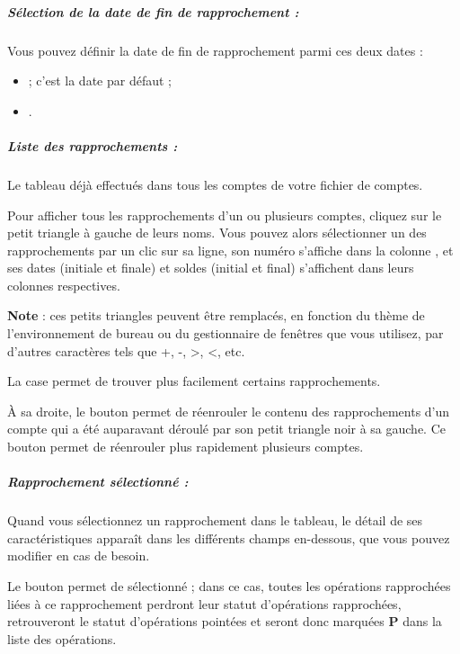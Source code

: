 \subparagraph{Sélection de la date de fin de rapprochement :\label{setup-operations-reconciliation-date}}

Vous pouvez définir la date de fin de rapprochement
 parmi ces deux dates :
\begin{itemize}
	\item {} ; c'est la date par défaut ;
	\item {}.
\end{itemize}


\subparagraph{Liste des rapprochements :}

Le tableau  déjà effectués dans tous les comptes de votre fichier de comptes. 

Pour afficher tous les rapprochements d'un ou plusieurs comptes, cliquez sur le petit triangle à gauche de leurs noms. Vous pouvez alors sélectionner un des rapprochements par un clic sur sa ligne, son numéro s'affiche dans la colonne , et ses dates (initiale et finale) et soldes (initial et final) s'affichent dans leurs colonnes respectives.

\textbf{Note} : ces petits triangles peuvent être remplacés, en fonction du thème de l'environnement de bureau ou du gestionnaire de fenêtres que vous utilisez, par d'autres caractères tels que +, -, >, <, etc.


La case  permet de trouver plus facilement certains rapprochements. 

À sa droite, le bouton   permet de réenrouler le contenu des rapprochements d'un compte qui a été auparavant déroulé par son petit triangle noir à sa gauche. Ce bouton permet de réenrouler plus rapidement plusieurs comptes.


\subparagraph{Rapprochement sélectionné :}

Quand vous sélectionnez un rapprochement dans le tableau, le détail de ses caractéristiques apparaît dans les différents champs en-dessous, que vous pouvez modifier en cas de besoin.

Le bouton  permet de  sélectionné ; dans ce cas, toutes les opérations rapprochées liées à ce rapprochement perdront leur statut d'opérations rapprochées, retrouveront le statut d'opérations pointées et seront donc marquées \og \textbf{P} \fg{} dans la liste des opérations. 

